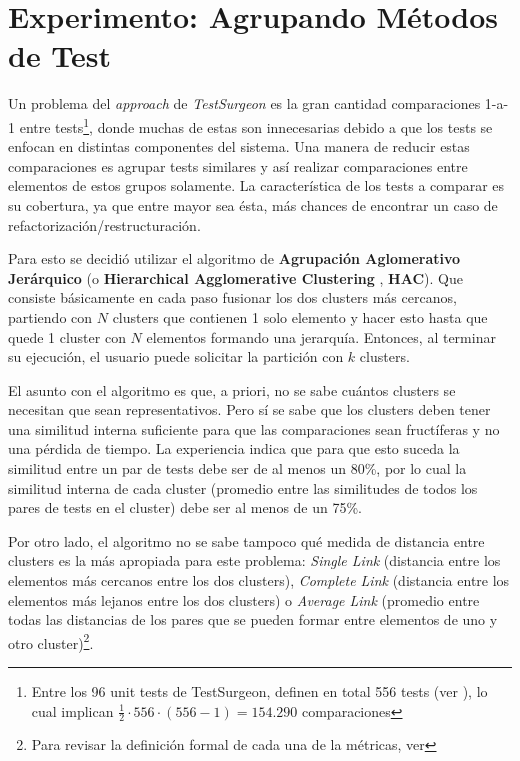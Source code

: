 
\chapter{Experimento: Agrupando Métodos de Test}

\par Un problema del \emph{approach} de \emph{TestSurgeon} es la gran cantidad  comparaciones 1-a-1 entre tests\footnote{Entre los 96 unit tests de TestSurgeon, definen en total 556 tests (ver ), lo cual implican $\frac{1}{2} \cdot 556 \cdot (556 -1)=154.290$ comparaciones}, donde muchas de estas son innecesarias debido a que los tests se enfocan en distintas componentes del sistema. Una manera de reducir estas comparaciones es agrupar tests similares y así realizar comparaciones entre elementos de estos grupos solamente. La característica de los tests a comparar es su cobertura, ya que entre mayor sea ésta, más chances de encontrar un caso de refactorización/restructuración. 

\par Para esto se decidió utilizar el algoritmo de \textbf{Agrupación Aglomerativo Jerárquico} (o \textbf{Hierarchical Agglomerative Clustering }, \textbf{HAC}). Que consiste básicamente en cada paso fusionar los dos clusters más cercanos, partiendo con $N$ clusters que contienen 1 solo elemento y hacer esto hasta que quede 1 cluster con $N$ elementos formando una jerarquía. Entonces, al terminar su ejecución, el usuario puede solicitar la partición con $k$ clusters. 

\par El asunto con el algoritmo es que, a priori, no se sabe cuántos clusters se necesitan que sean representativos. Pero sí se sabe que los clusters deben tener una similitud interna suficiente para que las comparaciones sean fructíferas y no una pérdida de tiempo. La experiencia indica que para que esto suceda la similitud entre un par de tests debe ser de al menos un 80\%, por lo cual la similitud interna de cada cluster (promedio entre las similitudes de todos los pares de tests en el cluster) debe ser al menos de un 75\%. 

\par Por otro lado, el algoritmo  no se sabe tampoco qué medida de distancia entre clusters es la más apropiada para este problema: \emph{Single Link} (distancia entre los elementos más cercanos entre los dos clusters), \emph{Complete Link} (distancia entre los elementos más lejanos entre los dos clusters) o \emph{Average Link} (promedio entre todas las distancias de los pares que se pueden formar entre elementos de uno y otro cluster)\footnote{Para revisar la definición formal de cada una de la métricas, ver }.  

